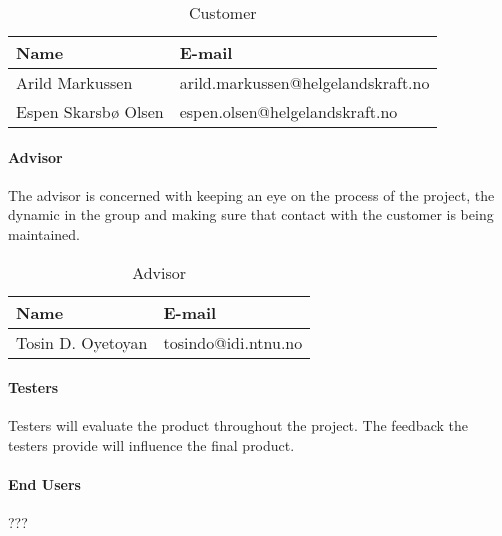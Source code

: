 \begin{table}

\begin{center}
    \begin{tabular}{| l | l |}
   	\hline
    {\bf Name} & {\bf E-mail} \\ \hline \hline
    Arild Markussen & arild.markussen@helgelandskraft.no \\ \hline
    Espen Skarsbø Olsen & espen.olsen@helgelandskraft.no \\ \hline
    \hline
    \end{tabular}
\end{center}

\caption{Customer}
\end{table}

\paragraph{Advisor}

The advisor is concerned with keeping an eye on the process of the project, the dynamic in the group and making sure that contact with the customer is being maintained. 

\begin{table}

\begin{center}
    \begin{tabular}{| l | l |}
    \hline
    {\bf Name} & {\bf E-mail} \\ \hline \hline
    Tosin D. Oyetoyan & tosindo@idi.ntnu.no \\ \hline
    \hline
    \end{tabular}
\end{center}

\caption{Advisor}
\end{table}

\paragraph{Testers}

Testers will evaluate the product throughout the project. The feedback the testers provide will influence the final product.

\paragraph{End Users}

???





